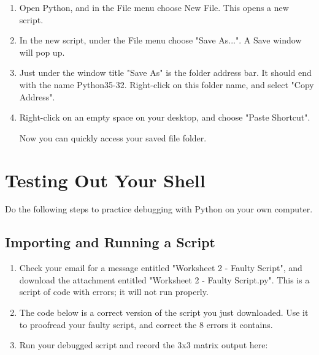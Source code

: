 \documentclass[paper=a4, fontsize=11pt]{scrartcl} %
\numberwithin{equation}{section} %
\numberwithin{figure}{section} %
\numberwithin{table}{section} %
\begin{document}
\begin{enumerate}

\item Open Python, and in the File menu choose New File.  This opens a new script.

\item In the new script, under the File menu choose "Save As...".  A Save window will pop up.

\item Just under the window title "Save As" is the folder address bar.  It should end with the name Python35-32.  Right-click on this folder name, and select "Copy Address".

\item Right-click on an empty space on your desktop, and choose "Paste Shortcut".

Now you can quickly access your saved file folder.

\end{enumerate}




\pagebreak

\section{Testing Out Your Shell}

Do the following steps to practice debugging with Python on your own computer.

\subsection{Importing and Running a Script}



\begin{enumerate}

\item Check your email for a message entitled "Worksheet 2 - Faulty Script", and download the attachment entitled "Worksheet 2 - Faulty Script.py".  This is a script of code with errors; it will not run properly.  

\item The code below is a correct version of the script you just downloaded.  Use it to proofread your faulty script, and correct the 8 errors it contains.  

\item Run your debugged script and record the 3x3 matrix output here:

\end{enumerate}
\end{document}
